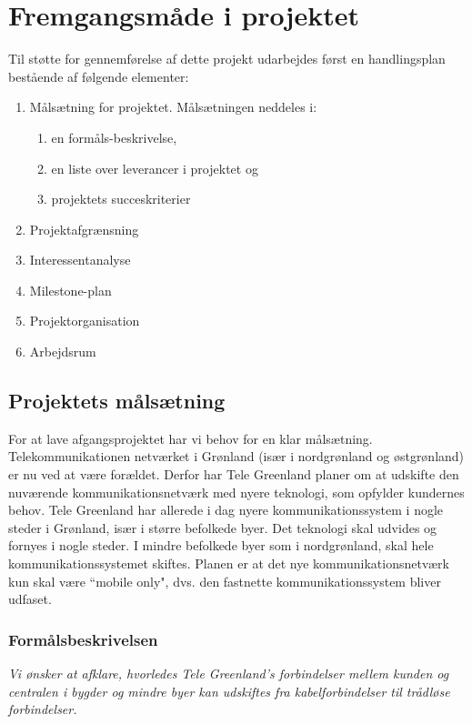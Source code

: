 \chapter{Fremgangsmåde i projektet}
Til støtte for gennemførelse af dette projekt udarbejdes først en handlingsplan bestående af følgende elementer:
\begin{enumerate}
 \item Målsætning for projektet. Målsætningen neddeles i:
  \begin{enumerate}
   \item en formåls-beskrivelse,
   \item en liste over leverancer i projektet og
   \item projektets succeskriterier
  \end{enumerate}
 \item Projektafgrænsning
 \item Interessentanalyse
 \item Milestone-plan
 \item Projektorganisation
 \item Arbejdsrum
\end{enumerate}

\section{Projektets målsætning}
For at lave afgangsprojektet har vi behov for en klar målsætning.\\

Telekommunikationen netværket i Grønland (især i nordgrønland og østgrønland) er nu ved at være forældet. Derfor har Tele Greenland planer om at udskifte den nuværende kommunikationsnetværk med nyere teknologi, som opfylder kundernes behov. Tele Greenland har allerede i dag nyere kommunikationssystem i nogle steder i Grønland, især i større befolkede byer. Det teknologi skal udvides og fornyes i nogle steder. I mindre befolkede byer som i nordgrønland, skal hele kommunikationssystemet skiftes. Planen er at det nye kommunikationsnetværk kun skal være “mobile only", dvs. den fastnette kommunikationssystem bliver udfaset.

\subsection{Formålsbeskrivelsen}
\emph{Vi ønsker at afklare, hvorledes Tele Greenland's forbindelser mellem kunden og centralen i bygder og mindre byer kan udskiftes fra kabelforbindelser til trådløse forbindelser.}\\

